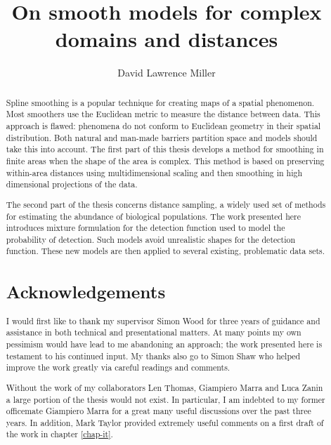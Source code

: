 \documentclass[12pt]{report}
\title{On smooth models for complex domains and distances}
\author{David Lawrence Miller}
\begin{document}
\maketitle

%



\begin{abstract} 
Spline smoothing is a popular technique for creating maps of a spatial phenomenon. Most smoothers use the Euclidean metric to measure the distance between data. This approach is flawed: phenomena do not conform to Euclidean geometry in their spatial distribution. Both natural and man-made barriers partition space and models should take this into account. The first part of this thesis develops a method for smoothing in finite areas when the shape of the area is complex. This method is based on preserving within-area distances using multidimensional scaling and then smoothing in high dimensional projections of the data.

The second part of the thesis concerns distance sampling, a widely used set of methods for estimating the abundance of biological populations. The work presented here introduces mixture formulation for the detection function used to model the probability of detection. Such models avoid unrealistic shapes for the detection function. These new models are then applied to several existing, problematic data sets.

\newpage

\begin{center}
\section*{Acknowledgements}
\end{center}
I would first like to thank my supervisor Simon Wood for three years of guidance and assistance in both technical and presentational matters. At many points my own pessimism would have lead to me abandoning an approach; the work presented here is testament to his continued input.  My thanks also go to Simon Shaw who helped improve the work greatly via careful readings and comments.

Without the work of my collaborators Len Thomas, Giampiero Marra and Luca Zanin a large portion of the thesis would not exist. In particular, I am indebted to my former officemate Giampiero Marra for a great many useful discussions over the past three years. In addition, Mark Taylor provided extremely useful comments on a first draft of the work in chapter \ref{chap-it}.


\end{abstract}
\end{document}
